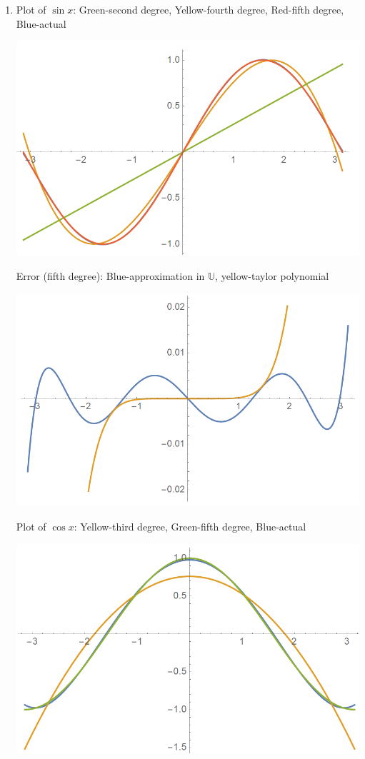 \begin{sol}
\begin{enumerate}[label=\textbf{(\alph*)}]
\item 
Plot of $\sin x$: Green-second degree, Yellow-fourth degree, Red-fifth degree, Blue-actual\\
\begin{center}
\includegraphics[scale=0.7]{P04/sinx.PNG}
\end{center}
Error (fifth degree): Blue-approximation in $\mathbb U$, yellow-taylor polynomial
\begin{center}
\includegraphics[scale=0.7]{P04/sin error.PNG}
\end{center}
Plot of $\cos x$: Yellow-third degree, Green-fifth degree, Blue-actual
\begin{center}
\includegraphics[scale=0.7]{P04/cosx.PNG}

\end{center}
\end{enumerate}
\end{sol}
